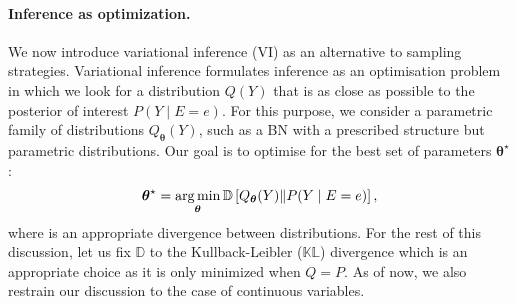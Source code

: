 
\paragraph{Inference as optimization.}
We now introduce variational inference (VI) as an alternative to sampling strategies. Variational inference formulates inference as an optimisation problem in which we look for a distribution $Q(Y)$ that is as close as possible to the posterior of interest $P(Y\mid E=e)$. For this purpose, we consider a parametric family of distributions $Q_{\bm{\theta}}(Y)$, such as a BN with a prescribed structure but parametric distributions. Our goal is to optimise for the best set of parameters $\bm{\theta}^\star$:
\begin{align}
  \bm{\theta}^\star = \operatorname*{arg\,min}_{\bm{\theta}} \mathbb{D}\left[Q_{\bm{\theta}}(Y)\Vert P(Y\mid E=e) \right], \label{eq:obj_VI}
\end{align}
where is an appropriate divergence between distributions. For the rest of this discussion, let us fix $\mathbb{D}$ to the Kullback-Leibler ($\mathbb{KL}$) divergence which is an appropriate choice as it is only minimized when $Q = P$. As of now, we also restrain our discussion to the case of continuous variables.


